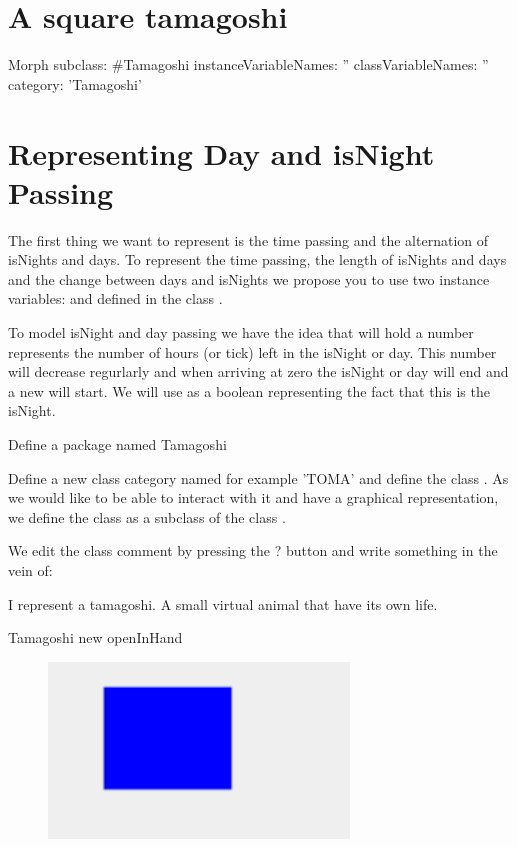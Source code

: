 \documentclass[a4paper,10pt,twoside]{book}
\begin{document}
\section{A square tamagoshi}

\begin{code}{}
Morph subclass: #Tamagoshi
	instanceVariableNames: ''
	classVariableNames: ''
	category: 'Tamagoshi'
\end{code}


\section{Representing Day and isNight Passing}
The first thing we want to represent is the time passing and the alternation of isNights and days.
To represent the time passing, the length of isNights and days and the change between days and isNights we propose you to use two instance variables:  and  defined in the class . 

To model isNight and day passing we have the idea that  will hold a number represents the number of hours (or tick) left in the isNight or day. This number will decrease regurlarly and when arriving at zero the isNight or day will end and a new will start. We will use  as a boolean  representing the fact that this is the isNight.

Define a package named Tamagoshi

Define a new class category named for example 'TOMA' and define the class . As we would like to be able to interact with it and have a graphical representation, we define  the class   as a subclass of the class . 


We edit the class comment by pressing the ? button and write something in the vein of:
\begin{code}{}
I represent a tamagoshi. A small virtual animal that have its own life.
\end{code}


\begin{code}{}
Tamagoshi new openInHand
\end{code}

\begin{figure}
\begin{center}
\includegraphics[width=8cm]{figures/squareTamagoshi}
\caption{\label{fig:tomastate}}
\end{center}
\end{figure}
\end{document}
